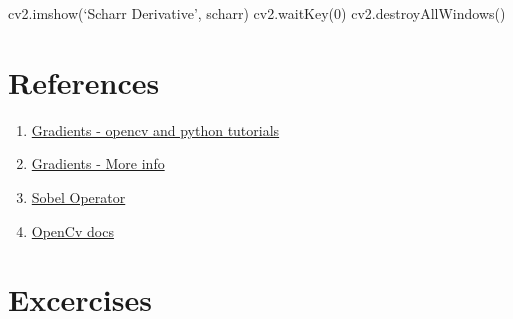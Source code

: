 \documentclass[]{article}
\newenvironment{Shaded}{}{}
\newcommand{\DecValTok}[1]{\textcolor[rgb]{0.25,0.63,0.44}{{#1}}}
\newcommand{\NormalTok}[1]{{#1}}
\begin{document}
\begin{itemize}
\begin{Shaded}
\begin{Highlighting}[]
\NormalTok{cv2.imshow(‘Scharr Derivative’, scharr)}
\NormalTok{cv2.waitKey(}\DecValTok{0}\NormalTok{)}
\NormalTok{cv2.destroyAllWindows()}
\end{Highlighting}
\end{Shaded}
\end{itemize}

\section{References}\label{references}

\begin{enumerate}
\def\labelenumi{\arabic{enumi}.}
\item
  \href{http://opencv-python-tutroals.readthedocs.org/en/latest/py\_tutorials/py\_imgproc
  /py\_gradients/py\_gradients.html}{Gradients - opencv and python tutorials}
\item
  \href{http://www.bogotobogo.com/python/OpenCV\_Python/python\_opencv3\_Image\_Gradient
  \_Sobel\_Laplacian\_Derivatives\_Edge\_Detection.php}{Gradients - More info}
\item
  \href{http://en.wikipedia.org/wiki/Sobel\_operator}{Sobel Operator}
\item
  \href{http://docs.opencv.org/doc/tutorials/imgproc/imgtrans/sobel
  \_derivatives/sobel\_derivatives.html}{OpenCv docs}
\end{enumerate}

\section{Excercises}\label{excercises}
\end{document}
